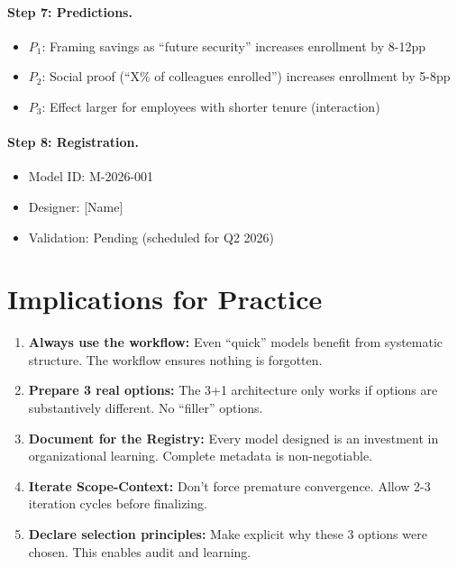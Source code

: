 \paragraph{Step 7: Predictions.}
\begin{itemize}
\item $P_1$: Framing savings as ``future security'' increases enrollment by 8-12pp
\item $P_2$: Social proof (``X\% of colleagues enrolled'') increases enrollment by 5-8pp
\item $P_3$: Effect larger for employees with shorter tenure (interaction)
\end{itemize}

\paragraph{Step 8: Registration.}
\begin{itemize}
\item Model ID: M-2026-001
\item Designer: [Name]
\item Validation: Pending (scheduled for Q2 2026)
\end{itemize}


\section{Implications for Practice}
\label{sec:eee-practice}

\begin{tcolorbox}[colback=green!5!white, colframe=green!75!black,
    title=Practical Implications]
\begin{enumerate}
\item \textbf{Always use the workflow:} Even ``quick'' models benefit from
    systematic structure. The workflow ensures nothing is forgotten.
\item \textbf{Prepare 3 real options:} The 3+1 architecture only works if
    options are substantively different. No ``filler'' options.
\item \textbf{Document for the Registry:} Every model designed is an
    investment in organizational learning. Complete metadata is non-negotiable.
\item \textbf{Iterate Scope-Context:} Don't force premature convergence.
    Allow 2-3 iteration cycles before finalizing.
\item \textbf{Declare selection principles:} Make explicit why these 3 options
    were chosen. This enables audit and learning.
\end{enumerate}
\end{tcolorbox}


